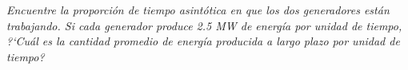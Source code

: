\emph{
    Encuentre la proporci\'on de tiempo asint\'otica en que los dos generadores est\'an trabajando. 
    Si cada generador produce 2.5 MW de energ\'ia por unidad de tiempo, ?`Cu\'al es la cantidad promedio 
    de energ\'ia producida a largo plazo por unidad de tiempo?\pn
}

\afterstatement\pn